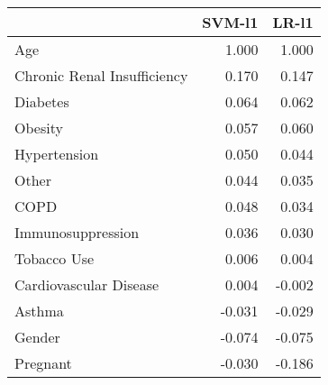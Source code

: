 \begin{tabular}{lrr}
\toprule
{} &  SVM-l1 &  LR-l1 \\
\midrule
Age                         &   1.000 &  1.000 \\
Chronic Renal Insufficiency &   0.170 &  0.147 \\
Diabetes                    &   0.064 &  0.062 \\
Obesity                     &   0.057 &  0.060 \\
Hypertension                &   0.050 &  0.044 \\
Other                       &   0.044 &  0.035 \\
COPD                        &   0.048 &  0.034 \\
Immunosuppression           &   0.036 &  0.030 \\
Tobacco Use                 &   0.006 &  0.004 \\
Cardiovascular Disease      &   0.004 & -0.002 \\
Asthma                      &  -0.031 & -0.029 \\
Gender                      &  -0.074 & -0.075 \\
Pregnant                    &  -0.030 & -0.186 \\
\bottomrule
\end{tabular}
